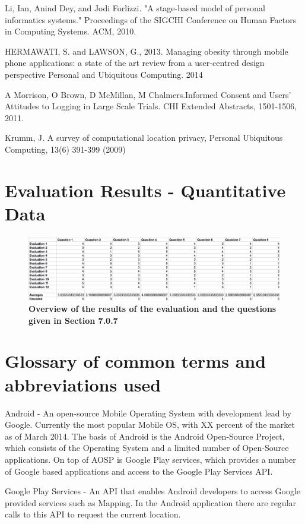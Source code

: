 \documentclass{l4proj}
\begin{document}
Li, Ian, Anind Dey, and Jodi Forlizzi. "A stage-based model of personal informatics systems." Proceedings of the SIGCHI Conference on Human Factors in Computing Systems. ACM, 2010.

HERMAWATI, S. and LAWSON, G., 2013. Managing obesity through mobile phone applications: a state of the art review from a user-centred design perspective Personal and Ubiquitous Computing. 2014

A Morrison, O Brown, D McMillan, M Chalmers.Informed Consent and Users' Attitudes to Logging in Large Scale Trials. CHI Extended Abstracts, 1501-1506, 2011.

Krumm, J. A survey of computational location privacy, Personal Ubiquitous Computing, 13(6) 391-399 (2009)


\section{Evaluation Results - Quantitative Data}

\begin{figure}[H]
\centering
\includegraphics[scale=0.4]{images/screenshots/resultsscreen.png}
\caption{\textbf{Overview of the results of the evaluation and the questions given in Section 7.0.7}}
\label{apndx:resultsscreen}
\end{figure}
 
\section{Glossary of common terms and abbreviations used}

Android - An open-source Mobile Operating System with development lead by Google. Currently the most popular Mobile OS, with XX percent of the market as of March 2014. The basis of Android is the Android Open-Source Project, which consists of the Operating System and a limited number of Open-Source applications. On top of AOSP is Google Play services, which provides a number of Google based applications and access to the Google Play Services API.

Google Play Services - An API that enables Android developers to access Google provided services such as Mapping. In the Android application there are regular calls to this API to request the current location.
\end{document}
